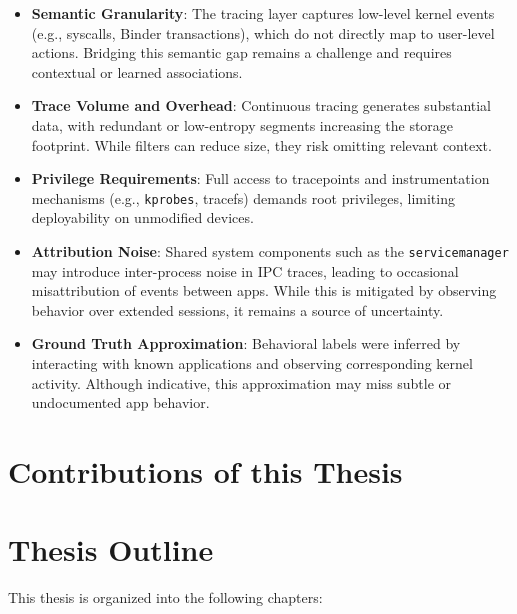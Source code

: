 \documentclass[a4paper,12pt]{report}
\begin{document}
\begin{itemize}
\item \textbf{Semantic Granularity}: The tracing layer captures low-level kernel events (e.g., syscalls, Binder transactions), which do not directly map to user-level actions. Bridging this semantic gap remains a challenge and requires contextual or learned associations.
\item \textbf{Trace Volume and Overhead}: Continuous tracing generates substantial data, with redundant or low-entropy segments increasing the storage footprint. While filters can reduce size, they risk omitting relevant context.
\item \textbf{Privilege Requirements}: Full access to tracepoints and instrumentation mechanisms (e.g., \texttt{kprobes}, tracefs) demands root privileges, limiting deployability on unmodified devices.
\item \textbf{Attribution Noise}: Shared system components such as the \texttt{servicemanager} may introduce inter-process noise in IPC traces, leading to occasional misattribution of events between apps. While this is mitigated by observing behavior over extended sessions, it remains a source of uncertainty.
\item \textbf{Ground Truth Approximation}: Behavioral labels were inferred by interacting with known applications and observing corresponding kernel activity. Although indicative, this approximation may miss subtle or undocumented app behavior.
\end{itemize}

\section{Contributions of this Thesis}

\section{Thesis Outline}
This thesis is organized into the following chapters:
\end{document}
